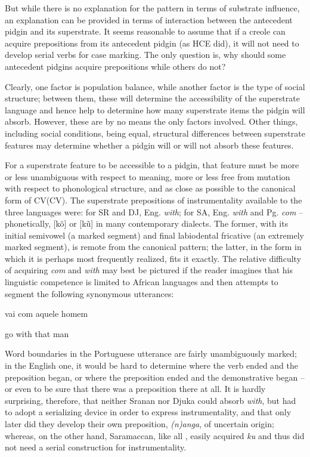 But while there is no explanation for the pattern in terms of substrate influence, an explanation can be provided in terms of interaction between the antecedent pidgin and its superstrate. It seems reasonable to assume that if a creole can acquire prepositions from its antecedent pidgin (as HCE did), it will not need to develop serial verbs for case marking. The only question is, why should some antecedent pidgins acquire prepositions while others do not?

Clearly, one factor is population balance, while another factor is the type of social structure; between them, these will determine the accessibility of the superstrate language and hence help to deter\-mine how many superstrate items the pidgin will absorb. However, these are by no means the only factors involved. Other things, including social conditions, being equal, structural differences between super\-strate features may determine whether a pidgin will or will not absorb these features.

For a superstrate feature to be accessible to a pidgin, that feature must be more or less unambiguous with respect to meaning, more or less free from mutation with respect to phonological structure, and as close as possible to the canonical form of CV(CV). The superstrate prepositions of instrumentality available to the three languages were: for SR and DJ, Eng. \textit{with}; for SA, Eng. \textit{with} and Pg. \textit{com} -- phonetically, [k\~o] or [k\~u] in many contemporary dialects. The former, with its initial semivowel (a marked segment) and final labiodental fricative (an extremely marked segment), is remote from the canonical pattern; the latter, in the form in which it is perhaps most frequently realized, fits it exactly. The relative difficulty of acquiring \textit{com} and \textit{with} may best be pictured if the reader imagines that his linguistic competence
is limited to African languages and then attempts to segment the following synonymous utterances:

\ea\label{ex:2:234}
vai com aquele homem
\z

\ea\label{ex:2:235}
go with that man
\z

Word boundaries in the Portuguese utterance are fairly un\-ambiguously marked; in the English one, it would be hard to determine where the verb ended and the preposition began, or where the preposi\-tion ended and the demonstrative began -- or even to be sure that there was a preposition there at all. It is hardly surprising, therefore, that neither Sranan nor Djuka could absorb \textit{with}, but had to adopt a serializing device in order to express instrumentality, and that only later did they develop their own preposition, \textit{(n)anga}, of uncertain origin; whereas, on the other hand, Saramaccan, like all , easily acquired \textit{ku} and thus did not need a serial construction for instrumentality.

